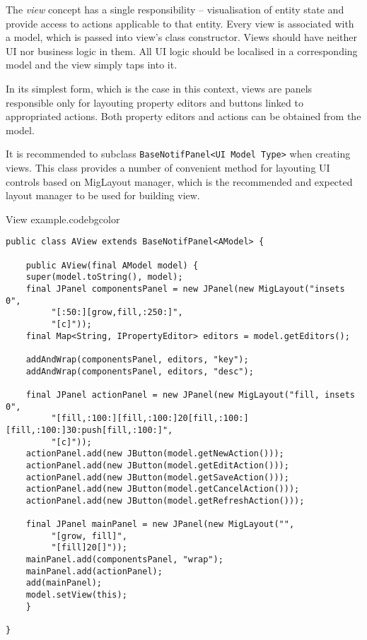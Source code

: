   The \emph{view} concept has a single responsibility -- visualisation of entity state and provide access to actions applicable to that entity.
  Every view is associated with a model, which is passed into view's class constructor.
  Views should have neither UI nor business logic in them.
  All UI logic should be localised in a corresponding model and the view simply taps into it.
  
  In its simplest form, which is the case in this context, views are panels responsible only for layouting property editors and buttons linked to appropriated actions.
  Both property editors and actions can be obtained from the model.
  
  It is recommended to subclass \texttt{BaseNotifPanel<UI Model Type>} when creating views.
  This class provides a number of convenient method for layouting UI controls based on MigLayout manager, which is the recommended and expected layout manager to be used for building view\cite{MigLayout}.

  
    \begin{code}{View example.}{\label{lst:view_example}}{codebgcolor}
    \begin{lstlisting}
public class AView extends BaseNotifPanel<AModel> {    

    public AView(final AModel model) {
	super(model.toString(), model);
	final JPanel componentsPanel = new JPanel(new MigLayout("insets 0", 
	     "[:50:][grow,fill,:250:]", 
	     "[c]"));
	final Map<String, IPropertyEditor> editors = model.getEditors();

	addAndWrap(componentsPanel, editors, "key");
	addAndWrap(componentsPanel, editors, "desc");

	final JPanel actionPanel = new JPanel(new MigLayout("fill, insets 0", 
	     "[fill,:100:][fill,:100:]20[fill,:100:][fill,:100:]30:push[fill,:100:]", 
	     "[c]"));
	actionPanel.add(new JButton(model.getNewAction()));
	actionPanel.add(new JButton(model.getEditAction()));
	actionPanel.add(new JButton(model.getSaveAction()));
	actionPanel.add(new JButton(model.getCancelAction()));
	actionPanel.add(new JButton(model.getRefreshAction()));

	final JPanel mainPanel = new JPanel(new MigLayout("", 
	     "[grow, fill]", 
	     "[fill]20[]"));
	mainPanel.add(componentsPanel, "wrap");
	mainPanel.add(actionPanel);
	add(mainPanel);
	model.setView(this);
    }

}
    \end{lstlisting}
  \end{code}
  
